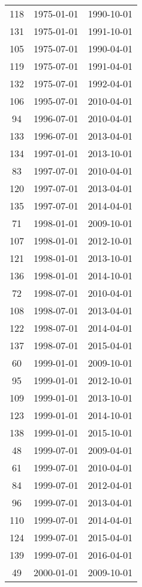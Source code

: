 % 
\begin{tabular}{ccc}
  \hline
  \hline
118 & 1975-01-01 & 1990-10-01 \\ 
  131 & 1975-01-01 & 1991-10-01 \\ 
  105 & 1975-07-01 & 1990-04-01 \\ 
  119 & 1975-07-01 & 1991-04-01 \\ 
  132 & 1975-07-01 & 1992-04-01 \\ 
  106 & 1995-07-01 & 2010-04-01 \\ 
  94 & 1996-07-01 & 2010-04-01 \\ 
  133 & 1996-07-01 & 2013-04-01 \\ 
  134 & 1997-01-01 & 2013-10-01 \\ 
  83 & 1997-07-01 & 2010-04-01 \\ 
  120 & 1997-07-01 & 2013-04-01 \\ 
  135 & 1997-07-01 & 2014-04-01 \\ 
  71 & 1998-01-01 & 2009-10-01 \\ 
  107 & 1998-01-01 & 2012-10-01 \\ 
  121 & 1998-01-01 & 2013-10-01 \\ 
  136 & 1998-01-01 & 2014-10-01 \\ 
  72 & 1998-07-01 & 2010-04-01 \\ 
  108 & 1998-07-01 & 2013-04-01 \\ 
  122 & 1998-07-01 & 2014-04-01 \\ 
  137 & 1998-07-01 & 2015-04-01 \\ 
  60 & 1999-01-01 & 2009-10-01 \\ 
  95 & 1999-01-01 & 2012-10-01 \\ 
  109 & 1999-01-01 & 2013-10-01 \\ 
  123 & 1999-01-01 & 2014-10-01 \\ 
  138 & 1999-01-01 & 2015-10-01 \\ 
  48 & 1999-07-01 & 2009-04-01 \\ 
  61 & 1999-07-01 & 2010-04-01 \\ 
  84 & 1999-07-01 & 2012-04-01 \\ 
  96 & 1999-07-01 & 2013-04-01 \\ 
  110 & 1999-07-01 & 2014-04-01 \\ 
  124 & 1999-07-01 & 2015-04-01 \\ 
  139 & 1999-07-01 & 2016-04-01 \\ 
  49 & 2000-01-01 & 2009-10-01 \\ 

\end{tabular}
